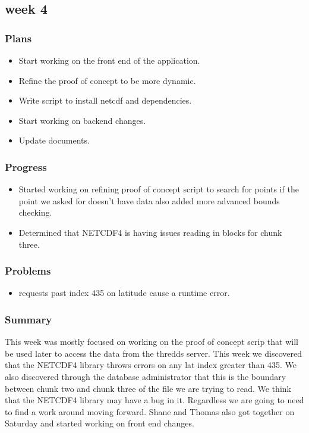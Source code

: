 \documentclass[onecolumn, draftclsnofoot,10pt, compsoc]{article}
\begin{document}
		\subsection{week 4}
			\subsubsection{Plans}
				\begin{itemize}
					\item Start working on the front end of the application.
					\item Refine the proof of concept to be more dynamic.
					\item Write script to install netcdf and dependencies.
					\item Start working on backend changes.
					\item Update documents.
				\end{itemize}
			\subsubsection{Progress}
				\begin{itemize}
					\item Started working on refining proof of concept script to search for points if the point we asked for doesn't have data also added more advanced bounds checking.
					\item Determined that NETCDF4 is having issues reading in blocks for chunk three.
				\end{itemize}
			\subsubsection{Problems}
				\begin{itemize}
					\item requests past index 435 on latitude cause a runtime error.
				\end{itemize}
			\subsubsection{Summary}
			This week was mostly focused on working on the proof of concept scrip that will be used later to access the data from the thredds server. This week we discovered that the NETCDF4 library throws errors on any lat index greater than 435. We also discovered through the database administrator that this is the boundary between chunk two and chunk three of the file we are trying to read. We think that the NETCDF4 library may have a bug in it. Regardless we are going to need to find a work around moving forward. Shane and Thomas also got together on Saturday and started working on front end changes.\\
\end{document}

